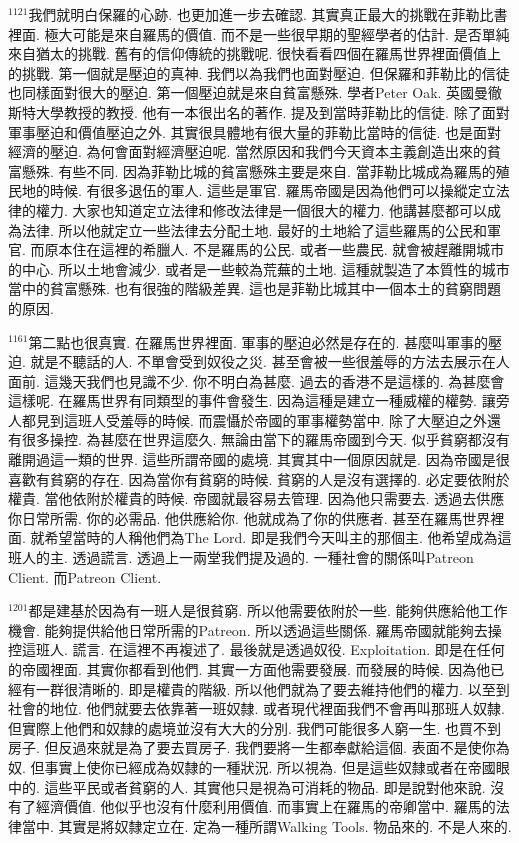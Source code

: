 \documentclass{book}
\begin{document}
$^{1121}$我們就明白保羅的心跡.
也更加進一步去確認.
其實真正最大的挑戰在菲勒比書裡面.
極大可能是來自羅馬的價值.
而不是一些很早期的聖經學者的估計.
是否單純來自猶太的挑戰.
舊有的信仰傳統的挑戰呢.
很快看看四個在羅馬世界裡面價值上的挑戰.
第一個就是壓迫的真神.
我們以為我們也面對壓迫.
但保羅和菲勒比的信徒也同樣面對很大的壓迫.
第一個壓迫就是來自貧富懸殊.
學者Peter Oak.
英國曼徹斯特大學教授的教授.
他有一本很出名的著作.
提及到當時菲勒比的信徒.
除了面對軍事壓迫和價值壓迫之外.
其實很具體地有很大量的菲勒比當時的信徒.
也是面對經濟的壓迫.
為何會面對經濟壓迫呢.
當然原因和我們今天資本主義創造出來的貧富懸殊.
有些不同.
因為菲勒比城的貧富懸殊主要是來自.
當菲勒比城成為羅馬的殖民地的時候.
有很多退伍的軍人.
這些是軍官.
羅馬帝國是因為他們可以操縱定立法律的權力.
大家也知道定立法律和修改法律是一個很大的權力.
他講甚麼都可以成為法律.
所以他就定立一些法律去分配土地.
最好的土地給了這些羅馬的公民和軍官.
而原本住在這裡的希臘人.
不是羅馬的公民.
或者一些農民.
就會被趕離開城市的中心.
所以土地會減少.
或者是一些較為荒蕪的土地.
這種就製造了本質性的城市當中的貧富懸殊.
也有很強的階級差異.
這也是菲勒比城其中一個本土的貧窮問題的原因.

$^{1161}$第二點也很真實.
在羅馬世界裡面.
軍事的壓迫必然是存在的.
甚麼叫軍事的壓迫.
就是不聽話的人.
不單會受到奴役之災.
甚至會被一些很羞辱的方法去展示在人面前.
這幾天我們也見識不少.
你不明白為甚麼.
過去的香港不是這樣的.
為甚麼會這樣呢.
在羅馬世界有同類型的事件會發生.
因為這種是建立一種威權的權勢.
讓旁人都見到這班人受羞辱的時候.
而震懾於帝國的軍事權勢當中.
除了大壓迫之外還有很多操控.
為甚麼在世界這麼久.
無論由當下的羅馬帝國到今天.
似乎貧窮都沒有離開過這一類的世界.
這些所謂帝國的處境.
其實其中一個原因就是.
因為帝國是很喜歡有貧窮的存在.
因為當你有貧窮的時候.
貧窮的人是沒有選擇的.
必定要依附於權貴.
當他依附於權貴的時候.
帝國就最容易去管理.
因為他只需要去.
透過去供應你日常所需.
你的必需品.
他供應給你.
他就成為了你的供應者.
甚至在羅馬世界裡面.
就希望當時的人稱他們為The Lord.
即是我們今天叫主的那個主.
他希望成為這班人的主.
透過謊言.
透過上一兩堂我們提及過的.
一種社會的關係叫Patreon Client.
而Patreon Client.

$^{1201}$都是建基於因為有一班人是很貧窮.
所以他需要依附於一些.
能夠供應給他工作機會.
能夠提供給他日常所需的Patreon.
所以透過這些關係.
羅馬帝國就能夠去操控這班人.
謊言.
在這裡不再複述了.
最後就是透過奴役.
Exploitation.
即是在任何的帝國裡面.
其實你都看到他們.
其實一方面他需要發展.
而發展的時候.
因為他已經有一群很清晰的.
即是權貴的階級.
所以他們就為了要去維持他們的權力.
以至到社會的地位.
他們就要去依靠著一班奴隸.
或者現代裡面我們不會再叫那班人奴隸.
但實際上他們和奴隸的處境並沒有大大的分別.
我們可能很多人窮一生.
也買不到房子.
但反過來就是為了要去買房子.
我們要將一生都奉獻給這個.
表面不是使你為奴.
但事實上使你已經成為奴隸的一種狀況.
所以視為.
但是這些奴隸或者在帝國眼中的.
這些平民或者貧窮的人.
其實他只是視為可消耗的物品.
即是說對他來說.
沒有了經濟價值.
他似乎也沒有什麼利用價值.
而事實上在羅馬的帝卿當中.
羅馬的法律當中.
其實是將奴隸定立在.
定為一種所謂Walking Tools.
物品來的.
不是人來的.
\end{document}
